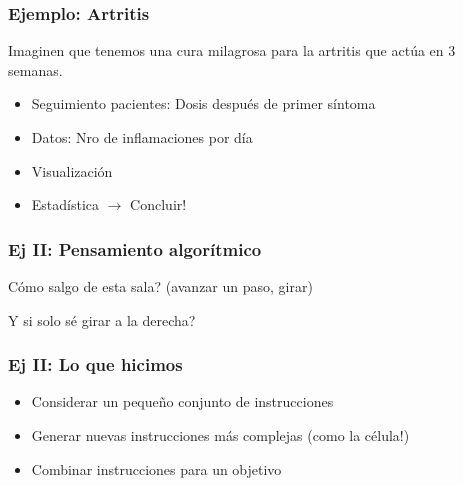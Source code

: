 \documentclass[14pt,aspectratio=169,xcolor=dvipsnames]{beamer}
\begin{document}
\begin{frame}[t]\frametitle{Ejemplo: Artritis}
Imaginen que tenemos una cura milagrosa para la artritis que actúa en 3 semanas. 
\begin{itemize}
    \item<1-> Seguimiento pacientes: Dosis después de primer síntoma
    \item<2-> Datos: Nro de inflamaciones por día
    \item<3-> Visualización
    \item<4-> Estadística $\to$ Concluir!
\end{itemize}
\end{frame}
\begin{frame}\frametitle{Ej II: Pensamiento algorítmico}
Cómo salgo de esta sala? (avanzar un paso, girar)

\vspace{2cm}
\pause Y si solo sé girar a la derecha?

\end{frame}
\begin{frame}\frametitle{Ej II: Lo que hicimos}
    \begin{itemize}
        \item Considerar un pequeño conjunto de instrucciones
        \item Generar nuevas instrucciones más complejas {\color{gray}(como la célula!)}
        \item Combinar instrucciones para un objetivo
    \end{itemize}
\end{frame}
\end{document}
